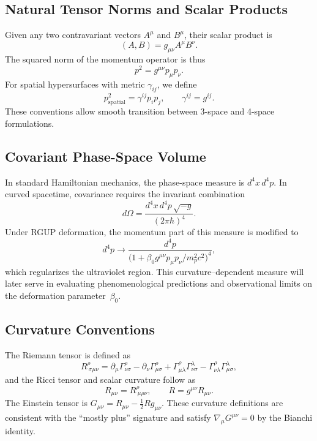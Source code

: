 \documentclass[11pt,oneside]{book}
\numberwithin{equation}{chapter}
\newcommand{\betaz}{\beta_0}
\begin{document}
\subsection*{Natural Tensor Norms and Scalar Products}

Given any two contravariant vectors $A^\mu$ and $B^\mu$, their scalar product is
\begin{equation}
(A,B) = g_{\mu\nu}A^\mu B^\nu.
\end{equation}
The squared norm of the momentum operator is thus
\begin{equation}
p^2 = g^{\mu\nu}p_\mu p_\nu.
\end{equation}
For spatial hypersurfaces with metric $\gamma_{ij}$, we define
\begin{equation}
p^2_{\text{spatial}} = \gamma^{ij}p_i p_j,
\qquad
\gamma^{ij} = g^{ij}.
\end{equation}
These conventions allow smooth transition between 3-space and 4-space formulations.

\subsection*{Covariant Phase-Space Volume}

In standard Hamiltonian mechanics, the phase-space measure is $d^4x\,d^4p$.  
In curved spacetime, covariance requires the invariant combination
\begin{equation}
d\Omega = \frac{d^4x\,d^4p\,\sqrt{-g}}{(2\pi\hbar)^4}.
\end{equation}
Under RGUP deformation, the momentum part of this measure is modified to
\begin{equation}
d^4p \rightarrow
\frac{d^4p}{
\big(1+\beta_0 g^{\mu\nu}p_\mu p_\nu/m_p^2 c^2\big)^4},
\end{equation}
which regularizes the ultraviolet region.  
This curvature–dependent measure will later serve in evaluating phenomenological predictions and observational limits on the deformation parameter~$\betaz$.

\subsection*{Curvature Conventions}

The Riemann tensor is defined as
\begin{equation}
R^\rho_{\ \sigma\mu\nu}
= \partial_\mu \Gamma^\rho_{\nu\sigma}
  - \partial_\nu \Gamma^\rho_{\mu\sigma}
  + \Gamma^\rho_{\mu\lambda}\Gamma^\lambda_{\nu\sigma}
  - \Gamma^\rho_{\nu\lambda}\Gamma^\lambda_{\mu\sigma},
\end{equation}
and the Ricci tensor and scalar curvature follow as
\begin{equation}
R_{\mu\nu} = R^\rho_{\ \mu\rho\nu},
\qquad
R = g^{\mu\nu}R_{\mu\nu}.
\end{equation}
The Einstein tensor is $G_{\mu\nu} = R_{\mu\nu} - \tfrac{1}{2}R g_{\mu\nu}$.  
These curvature definitions are consistent with the ``mostly plus'' signature and satisfy $\nabla_\mu G^{\mu\nu}=0$ by the Bianchi identity.
\end{document}
